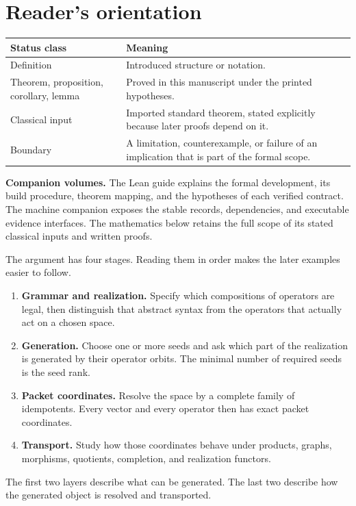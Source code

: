 \section*{Reader's orientation}
\begin{center}
\begin{tabularx}{0.96\textwidth}{@{}lY@{}}
\toprule
\textbf{Status class} & \textbf{Meaning}\\
\midrule
Definition & Introduced structure or notation.\\
Theorem, proposition, corollary, lemma & Proved in this manuscript under the printed hypotheses.\\
Classical input & Imported standard theorem, stated explicitly because later proofs depend on it.\\
Boundary & A limitation, counterexample, or failure of an implication that is part of the formal scope.\\
\bottomrule
\end{tabularx}
\end{center}

\noindent\textbf{Companion volumes.} The Lean guide explains the formal development, its build procedure, theorem mapping, and the hypotheses of each verified contract. The machine companion exposes the stable records, dependencies, and executable evidence interfaces. The mathematics below retains the full scope of its stated classical inputs and written proofs.


\begin{readerroadmap}
The argument has four stages. Reading them in order makes the later examples easier to follow.
\begin{enumerate}
\item \textbf{Grammar and realization.}  Specify which compositions of operators are legal, then distinguish that abstract syntax from the operators that actually act on a chosen space.
\item \textbf{Generation.}  Choose one or more seeds and ask which part of the realization is generated by their operator orbits.  The minimal number of required seeds is the seed rank.
\item \textbf{Packet coordinates.}  Resolve the space by a complete family of idempotents.  Every vector and every operator then has exact packet coordinates.
\item \textbf{Transport.}  Study how those coordinates behave under products, graphs, morphisms, quotients, completion, and realization functors.
\end{enumerate}
The first two layers describe what can be generated.  The last two describe how the generated object is resolved and transported.
\end{readerroadmap}

